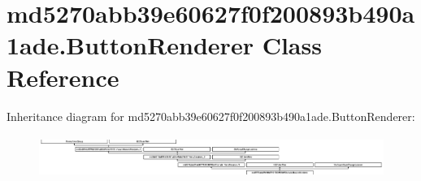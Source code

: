 \hypertarget{classmd5270abb39e60627f0f200893b490a1ade_1_1ButtonRenderer}{}\section{md5270abb39e60627f0f200893b490a1ade.\+Button\+Renderer Class Reference}
\label{classmd5270abb39e60627f0f200893b490a1ade_1_1ButtonRenderer}
Inheritance diagram for md5270abb39e60627f0f200893b490a1ade.\+Button\+Renderer\+:\begin{figure}[H]
\begin{center}
\leavevmode
\includegraphics[height=1.403509cm]{classmd5270abb39e60627f0f200893b490a1ade_1_1ButtonRenderer}
\end{center}
\end{figure}
